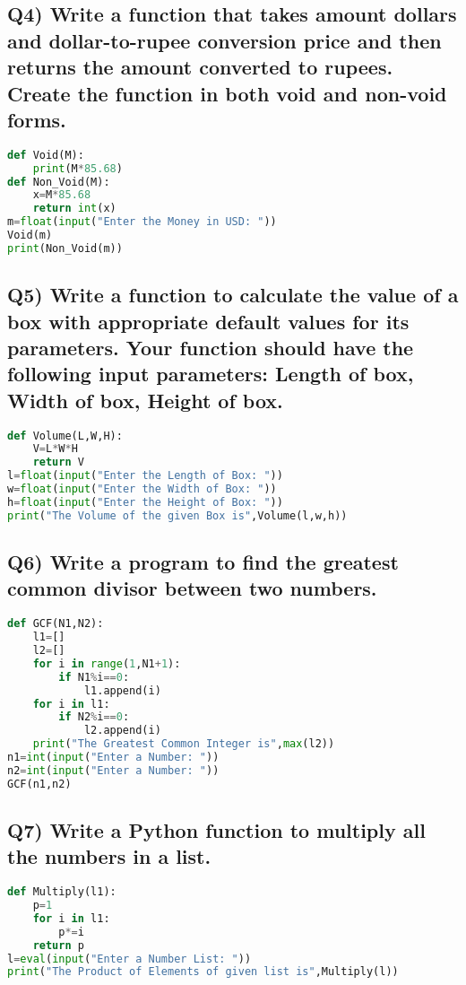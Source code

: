 \documentclass{article}
\begin{document}
\subsection*{Q4) Write a function that takes amount dollars and dollar-to-rupee conversion price and then returns the amount converted to rupees. Create the function in both void and non-void forms.}
\begin{lstlisting}[language=Python]
def Void(M):
    print(M*85.68)
def Non_Void(M):
    x=M*85.68
    return int(x)
m=float(input("Enter the Money in USD: "))
Void(m)
print(Non_Void(m))
\end{lstlisting}

\subsection*{Q5) Write a function to calculate the value of a box with appropriate default values for its parameters. Your function should have the following input parameters: Length of box, Width of box, Height of box.}
\begin{lstlisting}[language=Python]
def Volume(L,W,H):
    V=L*W*H
    return V
l=float(input("Enter the Length of Box: "))
w=float(input("Enter the Width of Box: "))
h=float(input("Enter the Height of Box: "))
print("The Volume of the given Box is",Volume(l,w,h))
\end{lstlisting}

\subsection*{Q6) Write a program to find the greatest common divisor between two numbers.}
\begin{lstlisting}[language=Python]
def GCF(N1,N2):
    l1=[]
    l2=[]
    for i in range(1,N1+1):
        if N1%i==0:
            l1.append(i)
    for i in l1:
        if N2%i==0:
            l2.append(i)
    print("The Greatest Common Integer is",max(l2))
n1=int(input("Enter a Number: "))
n2=int(input("Enter a Number: "))
GCF(n1,n2)
\end{lstlisting}

\subsection*{Q7) Write a Python function to multiply all the numbers in a list.}
\begin{lstlisting}[language=Python]
def Multiply(l1):
    p=1
    for i in l1:
        p*=i
    return p
l=eval(input("Enter a Number List: "))
print("The Product of Elements of given list is",Multiply(l))
\end{lstlisting}
\end{document}
